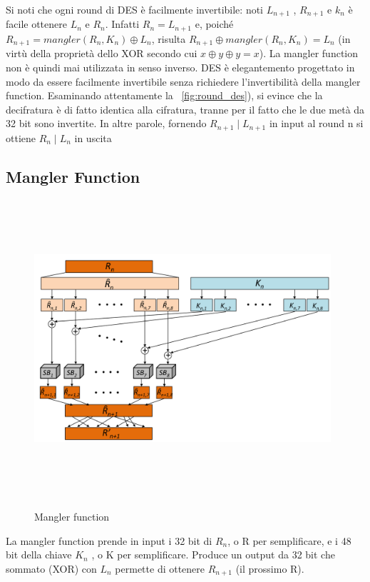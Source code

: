 Si noti che ogni round di DES è facilmente invertibile: noti $L_{n+1}$ , $R_{n+1}$ e $k_{n}$ è facile ottenere $L_{n}$ e $R_{n}$. Infatti $R_{n} = L_{n+1}$ e, poiché $R_{n+1} = mangler(R_{n}, K_{n}) \oplus L_{n}$, risulta $R_{n+1} \oplus mangler(R_{n}, K_{n}) = L_{n}$ (in virtù della proprietà dello XOR secondo cui $x \oplus y \oplus y = x$). La mangler function non è quindi mai utilizzata in senso inverso. DES è elegantemento progettato in modo da essere facilmente invertibile senza richiedere l'invertibilità della mangler function. Esaminando attentamente la \figurename ~\ref{fig:round_des}), si evince che la decifratura è di fatto identica alla cifratura, tranne per il fatto che le due metà da 32 bit sono invertite. In altre parole, fornendo $R_{n+1} \mid L_{n+1}$ in input al round n si ottiene $R_{n} \mid L_{n}$ in uscita
\subsection{Mangler Function}
\begin{figure}[htbp]
	\centering%
	\subfigure%
	{\includegraphics[height=11cm, width=11cm, keepaspectratio]{Immagini/Capitolo2/mangler.png}}
	\caption{Mangler function \label{fig:mangler}} 	
\end{figure}
La mangler function prende in input i 32 bit di $R_{n}$, o R per semplificare, e i 48 bit della chiave $K_{n}$ , o K per semplificare. Produce un output da 32 bit che sommato (XOR) con $L_{n}$ permette di ottenere $R_{n+1}$ (il prossimo R).\newline
